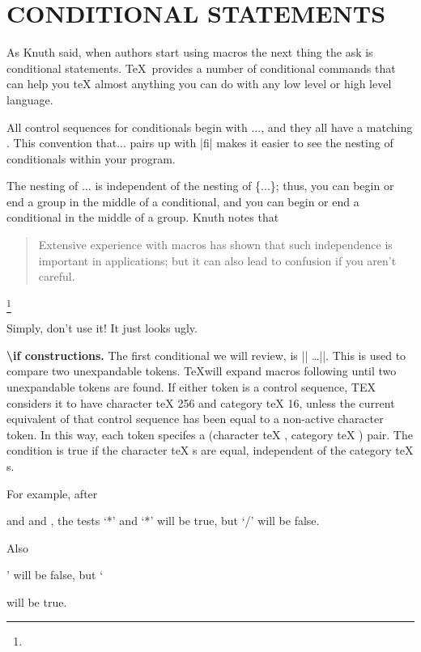 \section*{CONDITIONAL STATEMENTS}

\begin{multicols}{2}
As Knuth said, when authors start using macros the next thing the ask is conditional statements.
\TeX\  provides a number of  conditional commands that can help you  teX    almost anything you can do with any low level or high level language.

All  control sequences for conditionals begin with ...,
and they all have a matching . This convention that... pairs up
with |fi| makes it easier to see the nesting of conditionals within your program. 

The nesting of $\ldots$  is independent of the nesting of \{...\}; thus, you can begin or end
a group in the middle of a conditional, and you can begin or end a conditional in the
middle of a group. Knuth notes that

\begin{quotation}
Extensive experience with macros has shown that such independence
is important in applications; but it can also lead to confusion if you aren't careful.
\end{quotation}\footnote{\TODO}

Simply, don't use it! It just looks ugly.



\textbf{\textbackslash if constructions.} \quad The first conditional we will review, is |\if| \ldots |\fi|. This is used to compare two unexpandable tokens. \TeX will expand macros following  until two unexpandable tokens are found. If
either token is a control sequence, TEX considers it to have character  teX    256 and
category  teX    16, unless the current equivalent of that control sequence has been 
  equal to a non-active character token. In this way, each token specifes a (character
 teX   , category  teX   ) pair. The condition is true if the character  teX   s are equal,
independent of the category  teX   s.

 For example, after 
\end{multicols}

\begin{teXXX}
\def\a{*} and \let\b=* and \def\c{/}, 
the tests `\if*\a \fi' and `\if\a\b \fi' will be true, 
but `\if\a\c \fi' will be false.

Also \if\a\par\fi' will be false, 
but `\if\par\let \fi' will be true.

\end{teXXX}


